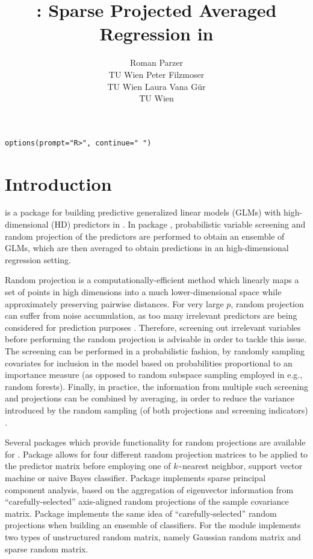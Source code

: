 \documentclass[
  article]{jss}
\author{Roman Parzer\\TU Wien \And Peter Filzmoser\\TU Wien \AND Laura
Vana Gür\\TU Wien}
\title{\pkg{SPAR}: Sparse Projected Averaged Regression in \proglang{R}}
\begin{document}
\maketitle


\begin{verbatim}
options(prompt="R>", continue=" ")
\end{verbatim}

\section{Introduction}\label{sec-intro}

 is a package for building predictive generalized linear
models (GLMs) with high-dimensional (HD) predictors in . In
package , probabilistic variable screening and random
projection of the predictors are performed to obtain an ensemble of
GLMs, which are then averaged to obtain predictions in an
high-dimensional regression setting.

Random projection is a computationally-efficient method which linearly
maps a set of points in high dimensions into a much lower-dimensional
space while approximately preserving pairwise distances. For very large
\(p\), random projection can suffer from noise accumulation, as too many
irrelevant predictors are being considered for prediction purposes
\citep{Dunson2020TargRandProj}. Therefore, screening out irrelevant
variables before performing the random projection is advisable in order
to tackle this issue. The screening can be performed in a probabilistic
fashion, by randomly sampling covariates for inclusion in the model
based on probabilities proportional to an importance measure (as opposed
to random subspace sampling employed in e.g., random forests). Finally,
in practice, the information from multiple such screening and
projections can be combined by averaging, in order to reduce the
variance introduced by the random sampling (of both projections and
screening indicators) \citep{Thanei2017RPforHDR}.

Several packages which provide functionality for random projections are
available for . Package 
\citep{RandProR, SIDDHARTH2020100629} allows for four different random
projection matrices to be applied to the predictor matrix before
employing one of \(k\)\textasciitilde nearest neighbor, support vector
machine or naive Bayes classifier. Package 
\citep{SPCAvRPR} implements sparse principal component analysis, based
on the aggregation of eigenvector information from
``carefully-selected'' axis-aligned random projections of the sample
covariance matrix. Package  \citep{RPEnsembleR}
implements the same idea of ``carefully-selected'' random projections
when building an ensemble of classifiers. For 
\citet{Python} the  module implements
two types of unstructured random matrix, namely Gaussian random matrix
and sparse random matrix.
\end{document}
